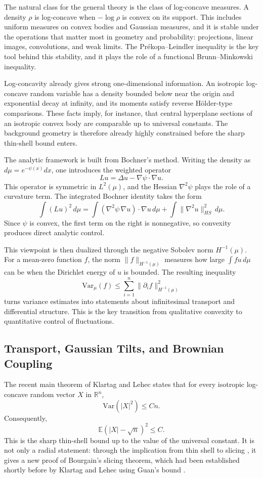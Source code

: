 \documentclass[10pt]{article}
\begin{document}
The natural class for the general theory is the class of log-concave measures. A density $\rho$ is log-concave when $-\log\rho$ is convex on its support. This includes uniform measures on convex bodies and Gaussian measures, and it is stable under the operations that matter most in geometry and probability: projections, linear images, convolutions, and weak limits. The Pr\'ekopa--Leindler inequality is the key tool behind this stability, and it plays the role of a functional Brunn--Minkowski inequality.

Log-concavity already gives strong one-dimensional information. An isotropic log-concave random variable has a density bounded below near the origin and exponential decay at infinity, and its moments satisfy reverse H\"older-type comparisons. These facts imply, for instance, that central hyperplane sections of an isotropic convex body are comparable up to universal constants. The background geometry is therefore already highly constrained before the sharp thin-shell bound enters.

The analytic framework is built from Bochner's method. Writing the density as $d\mu=e^{-\psi(x)}dx$, one introduces the weighted operator
\[
L u=\Delta u-\nabla\psi\cdot\nabla u.
\]
This operator is symmetric in $L^2(\mu)$, and the Hessian $\nabla^2\psi$ plays the role of a curvature term. The integrated Bochner identity takes the form
\[
\int (Lu)^2\,d\mu
=\int (\nabla^2\psi\,\nabla u)\cdot\nabla u\,d\mu
+\int \|\nabla^2u\|_{HS}^2\,d\mu.
\]
Since $\psi$ is convex, the first term on the right is nonnegative, so convexity produces direct analytic control.

This viewpoint is then dualized through the negative Sobolev norm $H^{-1}(\mu)$. For a mean-zero function $f$, the norm $\|f\|_{H^{-1}(\mu)}$ measures how large $\int f u\,d\mu$ can be when the Dirichlet energy of $u$ is bounded. The resulting inequality
\[
\mathrm{Var}_{\mu}(f)\leq \sum_{i=1}^n \|\partial_i f\|_{H^{-1}(\mu)}^2
\]
turns variance estimates into statements about infinitesimal transport and differential structure. This is the key transition from qualitative convexity to quantitative control of fluctuations.

\subsection{Transport, Gaussian Tilts, and Brownian Coupling}

The recent main theorem of Klartag and Lehec \cite[Theorem~1.1]{KL25} states that for every isotropic log-concave random vector $X$ in $\mathbb{R}^n$,
\[
\mathrm{Var}(|X|^2)\leq Cn.
\]
Consequently,
\[
\mathbb{E}(|X|-\sqrt{n})^2\leq C.
\]
This is the sharp thin-shell bound up to the value of the universal constant. It is not only a radial statement: through the implication from thin shell to slicing \cite{EK11}, it gives a new proof of Bourgain's slicing theorem, which had been established shortly before by Klartag and Lehec using Guan's bound \cite{Gua24,KL24}.
\end{document}

